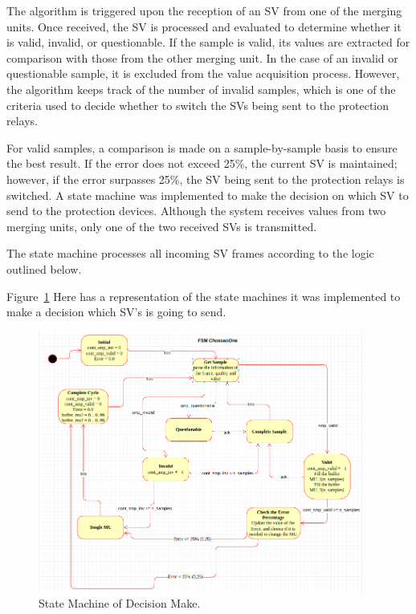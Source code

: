 The algorithm is triggered upon the reception of an SV from one of the merging units. Once received, the SV is processed and evaluated to determine whether it is valid, invalid, or questionable. If the sample is valid, its values are extracted for comparison with those from the other merging unit. In the case of an invalid or questionable sample, it is excluded from the value acquisition process. However, the algorithm keeps track of the number of invalid samples, which is one of the criteria used to decide whether to switch the SVs being sent to the protection relays.

For valid samples, a comparison is made on a sample-by-sample basis to ensure the best result. If the error does not exceed 25\%, the current SV is maintained; however, if the error surpasses 25\%, the SV being sent to the protection relays is switched. A state machine was implemented to make the decision on which SV to send to the protection devices. Although the system receives values from two merging units, only one of the two received SVs is transmitted.

The state machine processes all incoming SV frames according to the logic outlined below.

Figure~\ref{fig:state_machine} Here has a representation of the state machines it was implemented to make a decision which SV's is going to send. 

\begin{figure}[tbh!]
	\centering
	\includegraphics[width=0.95\textwidth, keepaspectratio]{ch4/assets/state_machine.png} %
	\caption{State Machine of Decision Make.}
	\label{fig:state_machine}
\end{figure}

